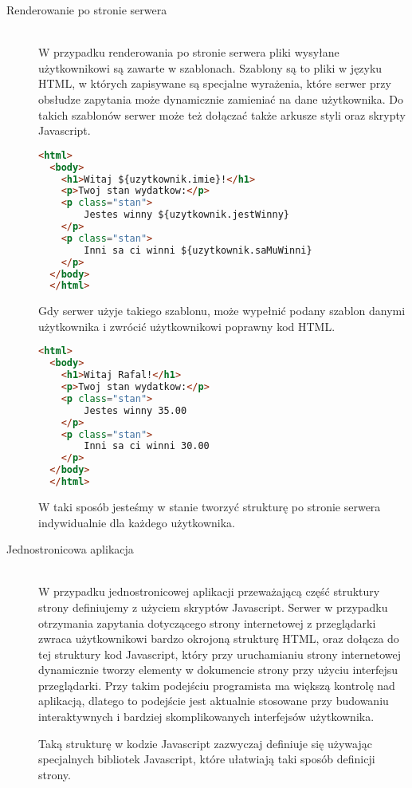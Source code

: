 \begin{description}
  \item[Renderowanie po stronie serwera] \hfill \\ W przypadku renderowania po stronie serwera pliki wysyłane użytkownikowi są zawarte w szablonach. Szablony są to pliki w języku HTML, w których zapisywane są specjalne wyrażenia, które serwer przy obsłudze zapytania może dynamicznie zamieniać na dane użytkownika. Do takich szablonów serwer może też dołączać także arkusze styli oraz skrypty Javascript.
  \begin{lstlisting}[language=HTML, caption=Przykład szablonu w Freemaker]
  <html>
  <body>
    <h1>Witaj ${uzytkownik.imie}!</h1>
    <p>Twoj stan wydatkow:</p>
    <p class="stan">
        Jestes winny ${uzytkownik.jestWinny}
    </p>
    <p class="stan">
        Inni sa ci winni ${uzytkownik.saMuWinni}
    </p>
  </body>
  </html>
  \end{lstlisting}

  Gdy serwer użyje takiego szablonu, może wypełnić podany szablon danymi użytkownika i zwrócić użytkownikowi poprawny kod HTML.

  \begin{lstlisting}[language=HTML, caption=Przykład wyniku zwróconego z szablonu]
  <html>
  <body>
    <h1>Witaj Rafal!</h1>
    <p>Twoj stan wydatkow:</p>
    <p class="stan">
        Jestes winny 35.00
    </p>
    <p class="stan">
        Inni sa ci winni 30.00
    </p>
  </body>
  </html>
  \end{lstlisting}
  W taki sposób jesteśmy w stanie tworzyć strukturę po stronie serwera indywidualnie dla każdego użytkownika.

  \item[Jednostronicowa aplikacja] \hfill \\ W przypadku jednostronicowej aplikacji przeważającą część struktury strony definiujemy z użyciem skryptów Javascript. Serwer w przypadku otrzymania zapytania dotyczącego strony internetowej z przeglądarki zwraca użytkownikowi bardzo okrojoną strukturę HTML, oraz dołącza do tej struktury kod Javascript, który przy uruchamianiu strony internetowej dynamicznie tworzy elementy w dokumencie strony przy użyciu interfejsu przeglądarki. Przy takim podejściu programista ma większą kontrolę nad aplikacją, dlatego to podejście jest aktualnie stosowane przy budowaniu interaktywnych i bardziej skomplikowanych interfejsów użytkownika.

  Taką strukturę w kodzie Javascript zazwyczaj definiuje się używając specjalnych bibliotek Javascript, które ułatwiają taki sposób definicji strony.


\end{description}
